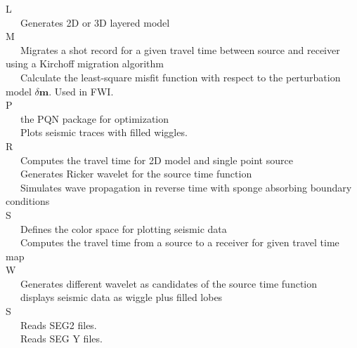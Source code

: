 \documentclass[11pt,titlepage]{article}
\newcommand{\bm}{\boldsymbol{m}}
\theoremstyle{plain}
\theoremstyle{definition}
\theoremstyle{remark}
\numberwithin{equation}{section}
\begin{document}
 

\noindent L\\
~~~Generates 2D or 3D layered model\\

\noindent M\\
~~~Migrates a shot record for a given travel time between source and receiver using a Kirchoff migration algorithm\\
~~~Calculate the least-square misfit function with respect to the perturbation model $\delta \bm$. Used in FWI.\\

\noindent P\\
~~~the PQN package for optimization\\
~~~Plots seismic traces with filled wiggles.\\

\noindent R\\
~~~Computes the travel time for 2D model and single point source\\
~~~Generates Ricker wavelet for the source time function\\
~~~Simulates wave propagation in reverse time with sponge absorbing boundary conditions\\

\noindent S\\
~~~Defines the color space for plotting seismic data\\
~~~Computes the travel time from a source to a receiver for given travel time map\\

\noindent W\\
~~~Generates different wavelet as candidates of the source time function\\
~~~displays seismic data as wiggle plus filled lobes\\


\noindent S\\
~~~Reads SEG2 files.\\
~~~Reads SEG Y files.\\


\noindent 




\end{document}
